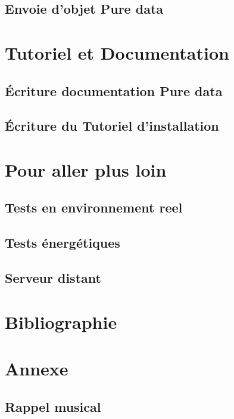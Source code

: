 \documentclass[a4paper, titlepage, oneside, 12pt]{article}%
\begin{document}
\subsection{Envoie d'objet Pure data}

\newpage
\section{Tutoriel et Documentation}
\subsection{Écriture documentation Pure data}
\subsection{Écriture du Tutoriel d'installation}

\newpage
\section{Pour aller plus loin}
\subsection{Tests en environnement reel}
\subsection{Tests énergétiques}
\subsection{Serveur distant}

\newpage
\section{Bibliographie}
\nocite{*}



\section{Annexe}
\subsection{Rappel musical}
\end{document}
